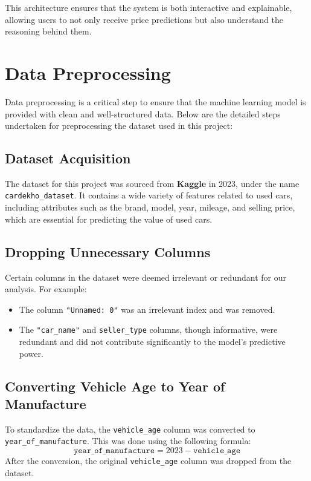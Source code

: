 \documentclass[a4paper,12pt]{article}
\begin{document}
This architecture ensures that the system is both interactive and explainable, allowing users to not only receive price predictions but also understand the reasoning behind them.

\section{Data Preprocessing}
\begin{justify}
Data preprocessing is a critical step to ensure that the machine learning model is provided with clean and well-structured data. Below are the detailed steps undertaken for preprocessing the dataset used in this project:

\subsection{Dataset Acquisition}
The dataset for this project was sourced from \textbf{Kaggle} in 2023, under the name \texttt{cardekho\_dataset}. It contains a wide variety of features related to used cars, including attributes such as the brand, model, year, mileage, and selling price, which are essential for predicting the value of used cars.

\subsection{Dropping Unnecessary Columns}
Certain columns in the dataset were deemed irrelevant or redundant for our analysis. For example:
\begin{itemize}
    \item The column \texttt{"Unnamed: 0"} was an irrelevant index and was removed.
    \item The \texttt{"car\_name"}  and \texttt{seller\_type} columns, though informative, were redundant and did not contribute significantly to the model's predictive power.
\end{itemize}

\subsection{Converting Vehicle Age to Year of Manufacture}
To standardize the data, the \texttt{vehicle\_age} column was converted to \texttt{year\_of\_manufacture}. This was done using the following formula:
\[
\texttt{year\_of\_manufacture} = 2023 - \texttt{vehicle\_age}
\]
After the conversion, the original \texttt{vehicle\_age} column was dropped from the dataset.


\end{justify}
\end{document}
